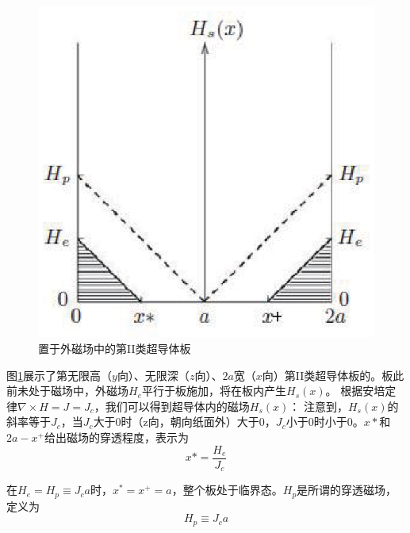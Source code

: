 \begin{figure}[htbp]
  \centering
 \includegraphics[scale=0.8]{chpt5/figs/fig5.1.eps}
  \caption{置于外磁场中的第II类超导体板}\label{fig:slabinfield}
\end{figure}
图\ref{fig:slabinfield}展示了第无限高（$y$向）、无限深（$z$向）、$2a$宽（$x$向）第II类超导体板的。板此前未处于磁场中，外磁场$H_e$平行于板施加，将在板内产生$H_s(x)$。
根据安培定律$\nabla \times H = J=J_c$，我们可以得到超导体内的磁场$H_s(x)$：
注意到，$H_s(x)$的斜率等于$J_c$，当$J_c$大于0时（z向，朝向纸面外）大于0，$J_c$小于0时小于0。$x*$和$2a-x^+$给出磁场的穿透程度，表示为
\begin{equation}
  x*=\frac{H_e}{J_c}
\end{equation}

在$H_e=H_p\equiv J_c a$时，$x^*=x^+=a$，整个板处于临界态。$H_p$是所谓的穿透磁场，定义为
\begin{equation}
  H_p\equiv J_c a
\end{equation}

